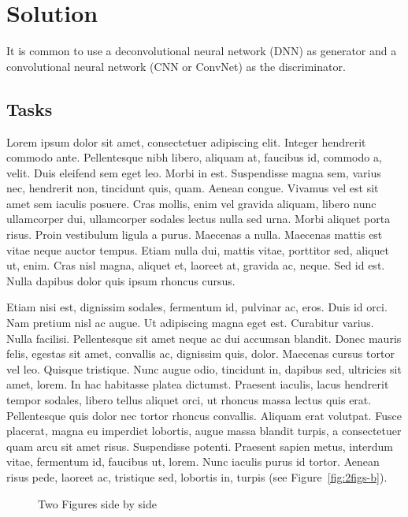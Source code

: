 \chapter{Solution} \label{chap:solution}

It is common to use a deconvolutional neural network (DNN) as generator and a convolutional neural network (CNN or ConvNet) as the discriminator. \cite{tahiroglu_-terity_2020}

\section{Tasks} \label{sec:tasks}

Lorem ipsum dolor sit amet, consectetuer adipiscing elit. Integer
hendrerit commodo ante. Pellentesque nibh libero, aliquam at, faucibus
id, commodo a, velit. Duis eleifend sem eget leo. Morbi in
est. Suspendisse magna sem, varius nec, hendrerit non, tincidunt quis,
quam. Aenean congue. Vivamus vel est sit amet sem iaculis
posuere. Cras mollis, enim vel gravida aliquam, libero nunc
ullamcorper dui, ullamcorper sodales lectus nulla sed urna. Morbi
aliquet porta risus. Proin vestibulum ligula a purus. Maecenas a
nulla. Maecenas mattis est vitae neque auctor tempus. Etiam nulla dui,
mattis vitae, porttitor sed, aliquet ut, enim. Cras nisl magna,
aliquet et, laoreet at, gravida ac, neque. Sed id est. Nulla dapibus
dolor quis ipsum rhoncus cursus. 

Etiam nisi est, dignissim sodales, fermentum id, pulvinar ac,
eros. Duis id orci. Nam pretium nisl ac augue. Ut adipiscing magna
eget est. Curabitur varius. Nulla facilisi. Pellentesque sit amet
neque ac dui accumsan blandit. Donec mauris felis, egestas sit amet,
convallis ac, dignissim quis, dolor. Maecenas cursus tortor vel
leo. Quisque tristique. Nunc augue odio, tincidunt in, dapibus sed,
ultricies sit amet, lorem. In hac habitasse platea dictumst. Praesent
iaculis, lacus hendrerit tempor sodales, libero tellus aliquet orci,
ut rhoncus massa lectus quis erat. Pellentesque quis dolor nec tortor
rhoncus convallis. Aliquam erat volutpat. Fusce placerat, magna eu
imperdiet lobortis, augue massa blandit turpis, a consectetuer quam
arcu sit amet risus. Suspendisse potenti. Praesent sapien metus,
interdum vitae, fermentum id, faucibus ut, lorem. Nunc iaculis purus
id tortor. Aenean risus pede, laoreet ac, tristique sed, lobortis in,
turpis (see Figure~\ref{fig:2figs-b}). 

\begin{figure}
  \qquad
  \caption{Two Figures side by side}
  \label{fig:2figs}
\end{figure}


